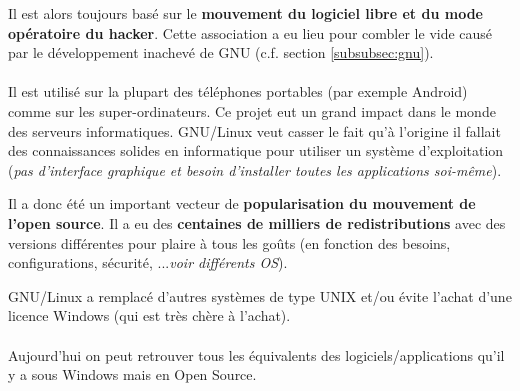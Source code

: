 Il est alors toujours basé sur le \textbf{mouvement du logiciel libre et du
mode opératoire du hacker}. Cette association a eu lieu pour combler le vide
causé par le développement inachevé de GNU (c.f. section \ref{subsubsec:gnu}).

\paragraph{} Il est utilisé sur la plupart des téléphones portables (par
exemple Android) comme sur les super-ordinateurs. Ce projet eut un grand impact
dans le monde des serveurs informatiques. GNU/Linux veut casser le fait qu'à
l'origine il fallait des connaissances solides en informatique pour utiliser un
système d'exploitation (\textit{pas d'interface graphique et besoin d'installer
toutes les applications soi-même}).

Il a donc été un important vecteur de \textbf{popularisation du mouvement de
l'open source}. Il a eu des \textbf{centaines de milliers de redistributions}
avec des versions différentes pour plaire à tous les goûts (en fonction des
besoins, configurations, sécurité, ...\textit{voir différents OS}).

GNU/Linux a remplacé d'autres systèmes de type UNIX et/ou évite l'achat d'une
licence Windows (qui est très chère à l'achat).

\paragraph{} Aujourd'hui on peut retrouver tous les équivalents des
logiciels/applications qu'il y a sous Windows mais en Open Source.
